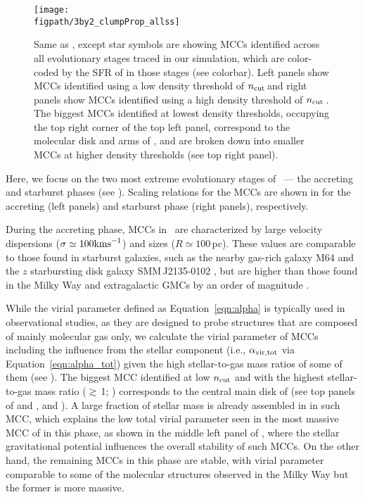\IfFileExists{emulateapjlegacy.cls}{\documentclass[iop]{emulateapjlegacy}}{\documentclass[iop]{emulateapj}}
\def\figpath{./Fig}
\begin{document}
\begin{figure*}
\centering
\texttt{[image: \\figpath/3by2\_clumpProp\_allss]}
\caption{Same as , except star symbols are showing MCCs identified across all evolutionary stages traced in our simulation, which are color-coded by the SFR of \flower in those stages (see colorbar). Left panels show MCCs identified using a low density threshold of $n_{\rm cut}$\,\cc and right panels show MCCs
identified using a high density threshold of $n_{\rm cut}$\,\cc.
The biggest MCCs identified at lowest density thresholds, occupying the top right corner of the top left panel, correspond to the molecular 
disk and arms of \flower, and are broken down into smaller MCCs at higher density thresholds (see top right panel).
\label{fig:alpha16-28}}
\end{figure*}


Here, we focus on the two most extreme evolutionary stages of \flower\ --- the accreting and starburst phases (see ). Scaling relations for the MCCs are shown in  for the accreting (left panels) and starburst phase (right panels), respectively.

During the accreting phase, MCCs in \flower\ are characterized by large velocity dispersions ($\sigma \simeq 100 {\rm km s}^{-1}$) and sizes ($R\simeq 100$\,pc). These values are comparable to those found in starburst galaxies, such as the nearby gas-rich galaxy M64 and the $z$ starbursting disk galaxy SMM\,J2135-0102 \citep{Rosolowsky05a, Swinbank11a}, but are higher than those found in the Milky Way and extragalactic GMCs by an order of magnitude \citep{Heyer04a, Bolatto08a}.

While the virial parameter defined as Equation~\ref{eqn:alpha} is typically used in observational studies, as they are designed to probe structures that are composed of mainly molecular gas only, we calculate the virial parameter of MCCs including the influence from the stellar component (i.e., $\alpha_{\rm vir, tot}$ via Equation~\ref{eqn:alpha_tot}) given the high stellar-to-gas mass ratios of some of them (see ).
% 
The biggest MCC identified at low $n_{\rm cut}$ and with the highest stellar-to-gas mass ratio ($\gtrsim$\,1; ) corresponds to the central main disk of \flower (see top panels of  and , and ). A large fraction of stellar mass is already assembled in \flower in such MCC, which explains the low total virial parameter seen in the most massive MCC of \flower in this phase, as shown in the middle left panel of , where the stellar gravitational potential influences the overall stability of such MCCs. On the other hand, the  remaining MCCs in this phase are stable, with virial parameter comparable to some of the molecular structures observed in the Milky Way but the former is more massive.
\end{document}
